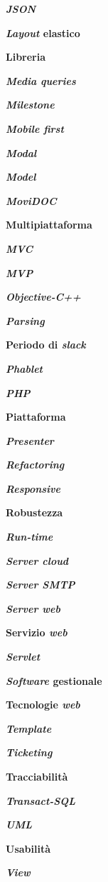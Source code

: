 \textbf{\textit{JSON}}

\textbf{\textit{Layout} elastico}

\textbf{Libreria}

\textbf{\textit{Media queries}}

\textbf{\textit{Milestone}}

\textbf{\textit{Mobile first}}

\textbf{\textit{Modal}}

\textbf{\textit{Model}}

\textbf{\textit{MoviDOC}}

\textbf{Multipiattaforma}

\textbf{\textit{MVC}}

\textbf{\textit{MVP}}

\textbf{\textit{Objective-C++}}

\textbf{\textit{Parsing}}

\textbf{Periodo di \textit{slack}}

\textbf{\textit{Phablet}}

\textbf{\textit{PHP}}

\textbf{Piattaforma}

\textbf{\textit{Presenter}}

\textbf{\textit{Refactoring}}

\textbf{\textit{Responsive}}

\textbf{Robustezza}

\textbf{\textit{Run-time}}

\textbf{\textit{Server cloud}}

\textbf{\textit{Server SMTP}}

\textbf{\textit{Server web}}

\textbf{Servizio \textit{web}}

\textbf{\textit{Servlet}}

\textbf{\textit{Software} gestionale}

\textbf{Tecnologie \textit{web}}

\textbf{\textit{Template}}

\textbf{\textit{Ticketing}}

\textbf{Tracciabilità}

\textbf{\textit{Transact-SQL}}

\textbf{\textit{UML}}

\textbf{Usabilità}

\textbf{\textit{View}}